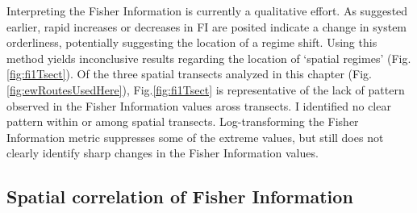 \documentclass[12pt,twoside,openany]{reedthesis}
\begin{document}
Interpreting the Fisher Information is currently a qualitative effort.
As suggested earlier, rapid increases or decreases in FI are posited
indicate a change in system orderliness, potentially suggesting the
location of a regime shift. Using this method yields inconclusive
results regarding the location of `spatial regimes' (Fig.
\ref{fig:fi1Tsect}). Of the three spatial transects analyzed in this
chapter (Fig. \ref{fig:ewRoutesUsedHere}), Fig.\ref{fig:fi1Tsect} is
representative of the lack of pattern observed in the Fisher Information
values aross transects. I identified no clear pattern within or among
spatial transects. Log-transforming the Fisher Information metric
suppresses some of the extreme values, but still does not clearly
identify sharp changes in the Fisher Information values.

\subsection{Spatial correlation of Fisher
Information}\label{spatial-correlation-of-fisher-information-1}
\end{document}

